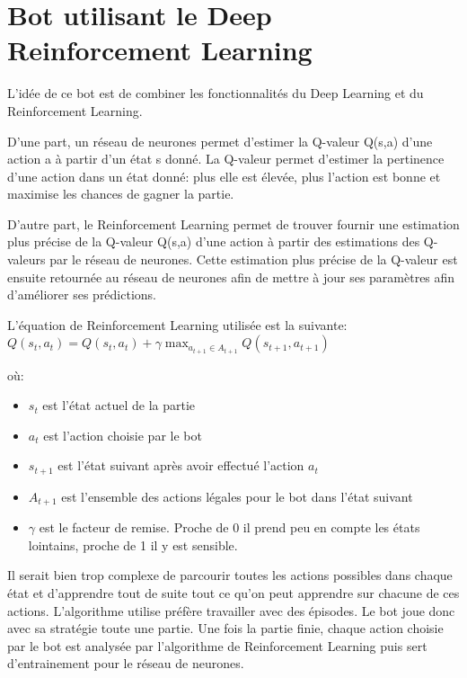 \documentclass[a4paper,12pt]{article}
\begin{document}
\section{Bot utilisant le Deep Reinforcement Learning}

L'idée de ce bot est de combiner les fonctionnalités du Deep Learning et du Reinforcement Learning.


D'une part, un réseau de neurones permet d'estimer la Q-valeur Q(s,a) d'une action a à partir d'un état s donné. La Q-valeur permet d'estimer la pertinence d'une action dans un état donné: plus elle est élevée, plus l'action est bonne et maximise les chances de gagner la partie.


D'autre part, le Reinforcement Learning permet de trouver fournir une estimation plus précise de la Q-valeur Q(s,a) d'une action à partir des estimations des Q-valeurs par le réseau de neurones. Cette estimation plus précise de la Q-valeur est ensuite retournée au réseau de neurones afin de mettre à jour ses paramètres afin d'améliorer ses prédictions.

L'équation de Reinforcement Learning utilisée est la suivante:\\

$Q(s_{t},a_{t}) = Q(s_{t},a_{t}) + \gamma \max_{a_{t+1} \in A_{t+1}} Q(s_{t+1},a_{t+1})$
\newline

où:
\begin{itemize}
    \item $s_{t}$ est l'état actuel de la partie
    \item $a_{t}$ est l'action choisie par le bot
    \item $s_{t+1}$ est l'état suivant après avoir effectué l'action $a_{t}$
    \item $A_{t+1}$ est l'ensemble des actions légales pour le bot dans l'état suivant
    \item $\gamma$ est le facteur de remise. Proche de 0 il prend peu en compte les états lointains, proche de 1 il y est sensible.
\end{itemize}
Il serait bien trop complexe de parcourir toutes les actions possibles dans chaque état et d'apprendre tout de suite tout ce qu'on peut apprendre sur chacune de ces actions. L'algorithme utilise préfère travailler avec des épisodes. Le bot joue donc avec sa stratégie toute une partie. Une fois la partie finie, chaque action choisie par le bot est analysée par l'algorithme de Reinforcement Learning puis sert d'entrainement pour le réseau de neurones.
\end{document}
